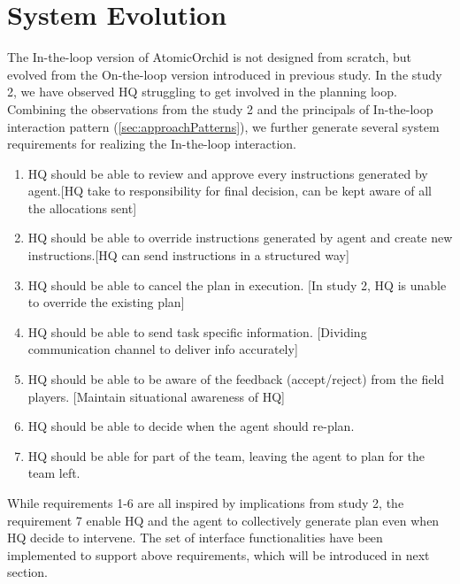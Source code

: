 \section{System Evolution}
The In-the-loop version of AtomicOrchid is not designed from scratch, but evolved from the On-the-loop version introduced in previous study. In the study 2, we have observed HQ struggling to get involved in the planning loop. Combining the observations from the study 2 and the principals of In-the-loop interaction pattern (\ref{sec:approachPatterns}), we further generate several system requirements for realizing the In-the-loop interaction. \\

\begin{enumerate}
\item HQ should be able to review and approve every instructions generated by agent.[HQ take to responsibility for final decision, can be kept aware of all the allocations sent]
\item HQ should be able to override instructions generated by agent and create new instructions.[HQ can send instructions in a structured way]
\item HQ should be able to cancel the plan in execution. [In study 2, HQ is unable to override the existing plan]
\item HQ should be able to send task specific information. [Dividing communication channel to deliver info accurately]
\item HQ should be able to be aware of the feedback (accept/reject) from the field players. [Maintain situational awareness of HQ]
\item HQ should be able to decide when the agent should re-plan. 
\item HQ should be able for part of the team, leaving the agent to plan for the team left. 
\end{enumerate}

While requirements 1-6 are all inspired by implications from study 2, the requirement 7 enable HQ and the agent to collectively generate plan even when HQ decide to intervene. The set of interface functionalities have been implemented to support above requirements, which will be introduced in next section. \\

 
